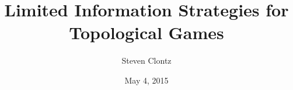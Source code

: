 \documentclass[12pt]{report}
\title{Limited Information Strategies for Topological Games}
\author{Steven Clontz}
\date{May 4, 2015} %
\theoremstyle{definition}
\begin{document}
\begin{romanpages}      %

\TitlePage




\tableofcontents
\listoffigures

\printnomenclature[0.5in] %
\end{romanpages}        %


\normalem       %












% 
\end{document}
